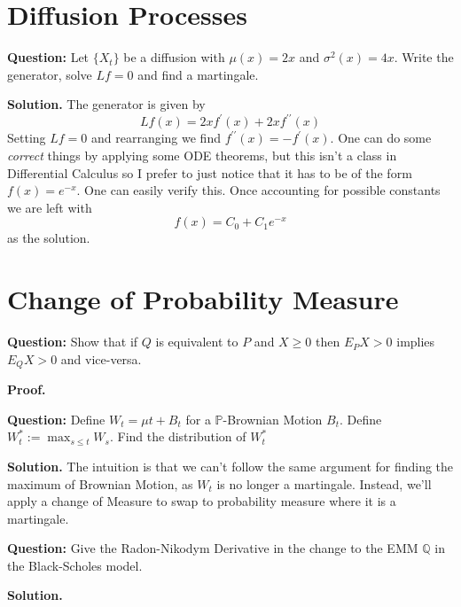 \documentclass{article}
\begin{document}
\newpage
\section{Diffusion Processes}

\begin{tcolorbox}[colframe=black,colback=gray!5,boxrule=0.5pt]
\textbf{Question:} Let $\{X_t\}$ be a diffusion with $\mu(x) = 2x$ and $\sigma^2(x) = 4x$. Write the generator, solve $Lf=0$ and find a martingale.  
\end{tcolorbox}
\textbf{Solution.} The generator is given by
$$Lf(x) = 2x f^\prime(x) + 2xf^{\prime\prime}(x)$$
Setting $Lf=0$ and rearranging we find $f^{\prime \prime}(x) = -f^\prime(x)$. One can do some \textit{correct} things by applying some ODE theorems, but this isn't a class in Differential Calculus so I prefer to just notice that it has to be of the form $f(x) = e^{-x}$. One can easily verify this. Once accounting for possible constants we are left with 
$$f(x) = C_0 + C_1e^{-x}$$
as the solution. 


\newpage
\section{Change of Probability Measure}

\begin{tcolorbox}[colframe=black,colback=gray!5,boxrule=0.5pt]
\textbf{Question:} Show that if $Q$ is equivalent to $P$ and $X\geq0$ then $E_PX > 0 $ implies $E_QX>0$ and vice-versa. 
\end{tcolorbox}
\textbf{Proof.} 


\begin{tcolorbox}[colframe=black,colback=gray!5,boxrule=0.5pt]
\textbf{Question:} Define $W_t = \mu t + B_t$ for a $\mathbb{P}$-Brownian Motion $B_t$. Define $W_t^*:=\max_{s\leq t} W_s$. Find the distribution of $W_t^*$
\end{tcolorbox}
\textbf{Solution.} The intuition is that we can't follow the same argument for finding the maximum of Brownian Motion, as $W_t$ is no longer a martingale. Instead, we'll apply a change of Measure to swap to probability measure where it is a martingale. 


\begin{tcolorbox}[colframe=black,colback=gray!5,boxrule=0.5pt]
\textbf{Question:} Give the Radon-Nikodym Derivative in the change to the EMM $\mathbb{Q}$ in the Black-Scholes model. 
\end{tcolorbox}
\textbf{Solution.} 
\end{document}
